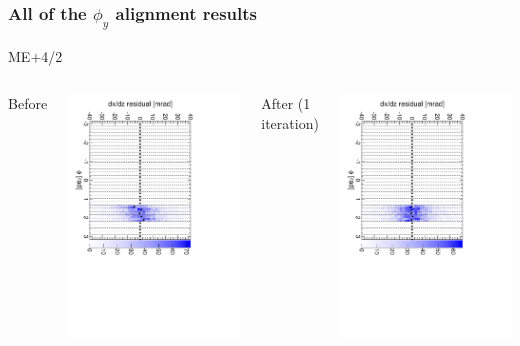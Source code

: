 \documentclass[compress]{beamer}
\begin{document}
\begin{frame}
\frametitle{All of the $\phi_y$ alignment results}
\begin{center}
ME$+$4/2
\end{center}

\begin{columns}
\centering Before

\includegraphics[height=\linewidth, angle=90]{iter01_mep42.pdf}

\centering After (1 iteration)

\includegraphics[height=\linewidth, angle=90]{iter02_mep42.pdf}
\end{columns}


\end{frame}
\end{document}
